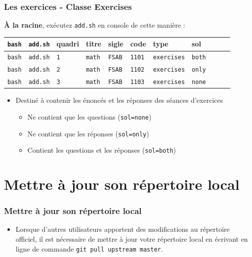 \documentclass{beamer}
\begin{document}
\begin{frame}
    \frametitle{Les exercices - Classe Exercises}
    \begin{exampleblock}{\textbf{À la racine}, exécutez \lstinline|add.sh| en
    console de cette manière :}
       \begin{tabular}{lllllllllll}
           \lstinline|bash| & \lstinline|add.sh| & quadri & titre & sigle & code & type & sol \\
           \hline
	   \lstinline|bash| & \lstinline|add.sh| & \lstinline|1| & \lstinline|math| & \lstinline|FSAB| & \lstinline|1101| & \lstinline|exercises| & \lstinline|both| \\
	   \lstinline|bash| & \lstinline|add.sh| & \lstinline|2| & \lstinline|math| & \lstinline|FSAB| & \lstinline|1102| & \lstinline|exercises| & \lstinline|only| \\
	   \lstinline|bash| & \lstinline|add.sh| & \lstinline|3| & \lstinline|math| & \lstinline|FSAB| & \lstinline|1103| & \lstinline|exercises| & \lstinline|none| \\
       \end{tabular}
   \end{exampleblock}
   \begin{itemize}
       \item Destiné à contenir les énoncés et les réponses des séances
           d'exercices
           \begin{itemize}
               \item Ne contient que les questions (\lstinline|sol=none|)
               \item Ne contient que les réponses (\lstinline|sol=only|)
               \item Contient les questions et les réponses (\lstinline|sol=both|)
       \end{itemize}
   \end{itemize}

\end{frame}

\section{Mettre à jour son répertoire local}

\begin{frame}
    \frametitle{Mettre à jour son répertoire local}
    \begin{itemize}
        \item Lorsque d'autres utilisateurs apportent des modifications au répertoire officiel, il est nécessaire de mettre à jour votre répertoire local en écrivant en ligne de commande \lstinline[mathescape]|git pull upstream master|.
    \end{itemize}
\end{frame}
\end{document}
